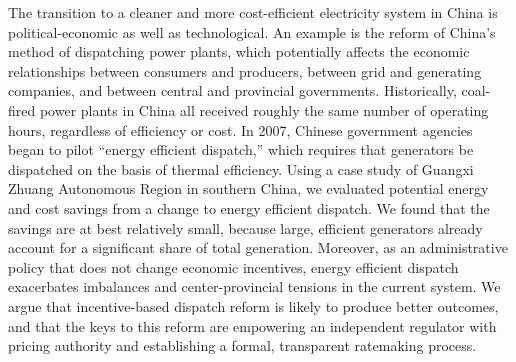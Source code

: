 The transition to a cleaner and more cost-efficient electricity system in China is political-economic as well as technological. An example is the reform of China's method of dispatching power plants, which potentially affects the economic relationships between consumers and producers, between grid and generating companies, and between central and provincial governments. Historically, coal-fired power plants in China all received roughly the same number of operating hours, regardless of efficiency or cost. In 2007, Chinese government agencies began to pilot “energy efficient dispatch,” which requires that generators be dispatched on the basis of thermal efficiency. Using a case study of Guangxi Zhuang Autonomous Region in southern China, we evaluated potential energy and cost savings from a change to energy efficient dispatch. We found that the savings are at best relatively small, because large, efficient generators already account for a significant share of total generation. Moreover, as an administrative policy that does not change economic incentives, energy efficient dispatch exacerbates imbalances and center-provincial tensions in the current system. We argue that incentive-based dispatch reform is likely to produce better outcomes, and that the keys to this reform are empowering an independent regulator with pricing authority and establishing a formal, transparent ratemaking process.
